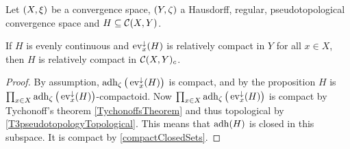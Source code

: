 \begin{corollary} \label{evenContinuityRelativeCompactness}
Let $\sSet{X,\xi}$ be a convergence space, $\sSet{Y, \zeta}$ a Hausdorff, regular, pseudotopological convergence space and $H\subseteq \operatorname{\mathcal{C}}(X, Y)$.

If $H$ is evenly continuous and $\operatorname{ev}_x^\downarrow(H)$ is relatively compact in $Y$ for all $x\in X$, then $H$ is relatively compact in $\operatorname{\mathcal{C}}(X, Y)_c$.
\end{corollary}
\begin{proof}
By assumption, $\operatorname{adh}_\zeta\big(\operatorname{ev}_x^\downarrow(H)\big)$ is compact, and by the proposition $H$ is $\prod_{x\in X}\operatorname{adh}_\zeta\big(\operatorname{ev}_x^\downarrow(H)\big)$-compactoid. Now $\prod_{x\in X}\operatorname{adh}_\zeta\big(\operatorname{ev}_x^\downarrow(H)\big)$ is compact by Tychonoff's theorem \ref{TychonoffsTheorem} and thus topological by \ref{T3pseudotopologyTopological}. This means that $\operatorname{adh}(H)$ is closed in this subspace. It is compact by \ref{compactClosedSets}.
\end{proof}


